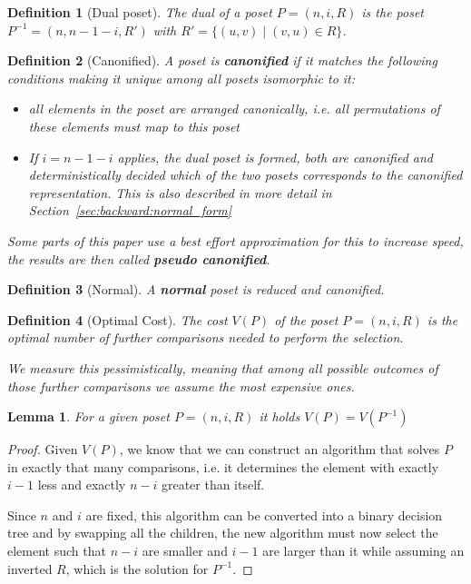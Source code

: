 \documentclass[10pt,journal,compsoc]{IEEEtran}
\newtheorem{lemma}{Lemma}
\newtheorem{definition}{Definition}
\begin{document}
\begin{definition}[Dual poset] \label{definition:dual_poset}
  The dual of a poset $P = (n, i, R)$ is the poset $P^{-1} = (n, n - 1 - i, R')$ with $R' = \{(u,v) \mid (v,u) \in R\}$.
\end{definition}

\begin{definition}[Canonified]
  A poset is \textbf{canonified} if it matches the following conditions making it unique among all posets isomorphic to it:
  \begin{itemize}
    \item all elements in the poset are arranged canonically, i.e. all permutations of these elements must map to this poset
    \item
          If $i = n - 1 - i$ applies, the dual poset is formed, both are canonified and deterministically decided which of the two posets corresponds to the canonified representation.
          This is also described in more detail in Section~\ref{sec:backward:normal_form}
  \end{itemize}

  Some parts of this paper use a best effort approximation for this to increase speed, the results are then called \textbf{pseudo canonified}.
\end{definition}

\begin{definition}[Normal]
  A \textbf{normal} poset is reduced and canonified.
\end{definition}

\begin{definition}[Optimal Cost]
  The cost $V(P)$ of the poset $P = (n, i, R)$ is the optimal number of further comparisons needed to perform the selection.

  We measure this pessimistically, meaning that among all possible outcomes of those further comparisons we assume the most expensive ones.
\end{definition}

\begin{lemma} \label{lemma:dual_poset_allowed}
  For a given poset $P = (n, i, R)$ it holds $V(P) = V(P^{-1})$
\end{lemma}

\begin{proof}
  Given $V(P)$, we know that we can construct an algorithm that solves $P$ in exactly that many comparisons, i.e. it determines the element with exactly $i - 1$ less and exactly $n - i$ greater than itself.

  Since $n$ and $i$ are fixed, this algorithm can be converted into a binary decision tree and by swapping all the children, the new algorithm must now select the element such that $n - i$ are smaller and $i - 1$ are larger than it while assuming an inverted $R$, which is the solution for $P^{-1}$.
\end{proof}
\end{document}
